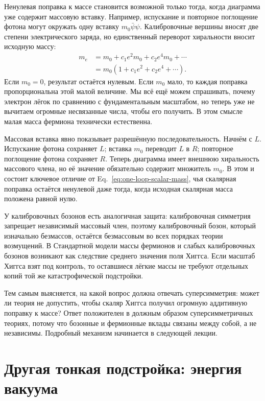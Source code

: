 Ненулевая поправка к массе становится возможной только тогда, когда диаграмма уже содержит массовую вставку. Например, испускание и повторное поглощение фотона могут окружать одну вставку \(m_0\bar\psi\psi\). Калибровочные вершины вносят две степени электрического заряда, но единственный переворот хиральности вносит исходную массу:
\begin{equation}
\begin{aligned}
m_e
&=m_0+c_1e^2m_0+c_2e^4m_0+\cdots\\
&=m_0\left(1+c_1e^2+c_2e^4+\cdots\right).
\end{aligned}
\label{eq:multiplicative-fermion-mass}
\end{equation}
Если \(m_0=0\), результат остаётся нулевым. Если \(m_0\) мало, то каждая поправка пропорциональна этой малой величине. Мы всё ещё можем спрашивать, почему электрон лёгок по сравнению с фундаментальным масштабом, но теперь уже не вычитаем огромные несвязанные числа, чтобы его получить. В этом смысле малая масса фермиона технически естественна.

Массовая вставка явно показывает разрешённую последовательность. Начнём с \(L\). Испускание фотона сохраняет \(L\); вставка \(m_0\) переводит \(L\) в \(R\); повторное поглощение фотона сохраняет \(R\). Теперь диаграмма имеет внешнюю хиральность массового члена, но её значение обязательно содержит множитель \(m_0\). В этом и состоит ключевое отличие от Eq.~\eqref{eq:one-loop-scalar-mass}, чья скалярная поправка остаётся ненулевой даже тогда, когда исходная скалярная масса положена равной нулю.

У калибровочных бозонов есть аналогичная защита: калибровочная симметрия запрещает независимый массовый член, поэтому калибровочный бозон, который изначально безмассов, остаётся безмассовым во всех порядках теории возмущений. В Стандартной модели массы фермионов и слабых калибровочных бозонов возникают как следствие среднего значения поля Хиггса. Если масштаб Хиггса взят под контроль, то оставшиеся лёгкие массы не требуют отдельных копий той же катастрофической подстройки.

Тем самым выясняется, на какой вопрос должна отвечать суперсимметрия: может ли теория не допустить, чтобы скаляр Хиггса получил огромную аддитивную поправку к массе? Ответ положителен в должным образом суперсимметричных теориях, потому что бозонные и фермионные вклады связаны между собой, а не независимы. Подробный механизм начинается в следующей лекции.

\section{Другая тонкая подстройка: энергия вакуума}

